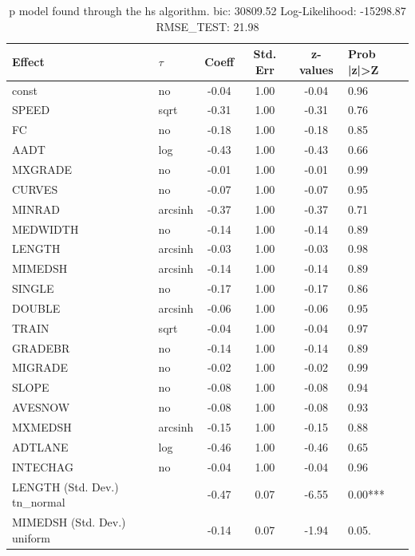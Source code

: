 \begin{table}
	\caption{p model found through the hs algorithm. bic: 30809.52 Log-Likelihood: -15298.87 RMSE_TEST: 21.98}
	\begin{center}
		\begin{tabular}{|l|l|c|c|c|l|}
			\hline
			Effect & $\tau$ & Coeff & Std. Err & z-values & Prob |z|>Z \\
			\hline
			const & no & -0.04 & 1.00 & -0.04 & 0.96 \\
			\hline
			SPEED & sqrt & -0.31 & 1.00 & -0.31 & 0.76 \\
			\hline
			FC & no & -0.18 & 1.00 & -0.18 & 0.85 \\
			\hline
			AADT & log & -0.43 & 1.00 & -0.43 & 0.66 \\
			\hline
			MXGRADE & no & -0.01 & 1.00 & -0.01 & 0.99 \\
			\hline
			CURVES & no & -0.07 & 1.00 & -0.07 & 0.95 \\
			\hline
			MINRAD & arcsinh & -0.37 & 1.00 & -0.37 & 0.71 \\
			\hline
			MEDWIDTH & no & -0.14 & 1.00 & -0.14 & 0.89 \\
			\hline
			LENGTH & arcsinh & -0.03 & 1.00 & -0.03 & 0.98 \\
			\hline
			MIMEDSH & arcsinh & -0.14 & 1.00 & -0.14 & 0.89 \\
			\hline
			SINGLE & no & -0.17 & 1.00 & -0.17 & 0.86 \\
			\hline
			DOUBLE & arcsinh & -0.06 & 1.00 & -0.06 & 0.95 \\
			\hline
			TRAIN & sqrt & -0.04 & 1.00 & -0.04 & 0.97 \\
			\hline
			GRADEBR & no & -0.14 & 1.00 & -0.14 & 0.89 \\
			\hline
			MIGRADE & no & -0.02 & 1.00 & -0.02 & 0.99 \\
			\hline
			SLOPE & no & -0.08 & 1.00 & -0.08 & 0.94 \\
			\hline
			AVESNOW & no & -0.08 & 1.00 & -0.08 & 0.93 \\
			\hline
			MXMEDSH & arcsinh & -0.15 & 1.00 & -0.15 & 0.88 \\
			\hline
			ADTLANE & log & -0.46 & 1.00 & -0.46 & 0.65 \\
			\hline
			INTECHAG & no & -0.04 & 1.00 & -0.04 & 0.96 \\
			\hline
			LENGTH (Std. Dev.) tn_normal &  & -0.47 & 0.07 & -6.55 & 0.00*** \\
			\hline
			MIMEDSH (Std. Dev.) uniform &  & -0.14 & 0.07 & -1.94 & 0.05. \\

\end{tabular}
\end{center}
\end{table}
